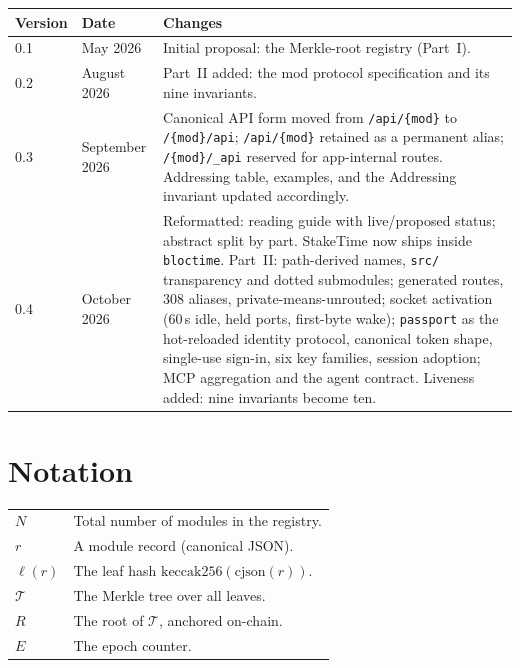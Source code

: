 \documentclass[11pt,a4paper]{article}
\begin{document}
\begin{tabularx}{\textwidth}{llX}
\toprule
\textbf{Version} & \textbf{Date} & \textbf{Changes} \\
\midrule
0.1 & May 2026 & Initial proposal: the Merkle-root registry (Part~I). \\
0.2 & August 2026 & Part~II added: the mod protocol specification and its nine invariants. \\
0.3 & September 2026 & Canonical API form moved from \texttt{/api/\{mod\}} to \texttt{/\{mod\}/api}; \texttt{/api/\{mod\}} retained as a permanent alias; \texttt{/\{mod\}/\_api} reserved for app-internal routes. Addressing table, examples, and the Addressing invariant updated accordingly. \\
0.4 & October 2026 & Reformatted: reading guide with live/proposed status; abstract split by part. StakeTime now ships inside \texttt{bloctime}. Part~II: path-derived names, \texttt{src/} transparency and dotted submodules; generated routes, 308 aliases, private-means-unrouted; socket activation (60\,s idle, held ports, first-byte wake); \texttt{passport} as the hot-reloaded identity protocol, canonical token shape, single-use sign-in, six key families, session adoption; MCP aggregation and the agent contract. Liveness added: nine invariants become ten. \\
\bottomrule
\end{tabularx}

\section{Notation}

\begin{tabularx}{\textwidth}{lX}
\toprule
$N$ & Total number of modules in the registry. \\
$r$ & A module record (canonical JSON). \\
$\ell(r)$ & The leaf hash $\mathrm{keccak256}(\mathrm{cjson}(r))$. \\
$\mathcal{T}$ & The Merkle tree over all leaves. \\
$R$ & The root of $\mathcal{T}$, anchored on-chain. \\
$E$ & The epoch counter. \\
\bottomrule
\end{tabularx}
\end{document}
